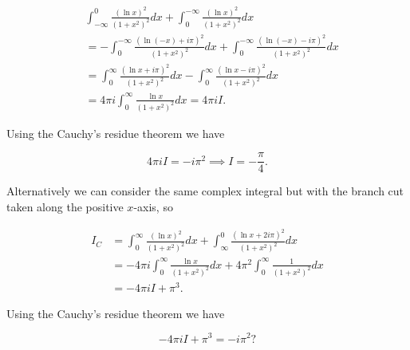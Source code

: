 \documentclass[english,a4paper,12pt]{report}
\begin{document}
{\begin{equation}
    \begin{aligned}
        &\int_{-\infty}^{0} \frac{(\ln x)^2}{(1+x^2)^2} dx + \int_{0}^{-\infty} \frac{(\ln x)^2}{(1+x^2)^2}dx \\
        &= -\int_{0}^{-\infty} \frac{(\ln (-x)+i\pi )^2}{(1+x^2)^2}dx + \int_{0}^{-\infty} \frac{(\ln (-x)-i\pi )^2}{(1+x^2)^2}dx\\
        &= \int_{0}^{\infty} \frac{(\ln x+i\pi )^2}{(1+x^2)^2}dx - \int_{0}^{\infty} \frac{(\ln x-i\pi )^2}{(1+x^2)^2}dx \\
        &= 4\pi i \int_{0}^{\infty} \frac{\ln x}{(1+x^2)^2}dx = 4\pi iI.                
    \end{aligned}
\end{equation}

Using the Cauchy's residue theorem we have 

\begin{equation}
    4\pi i I = -i\pi ^2 \implies I = -\frac{\pi }{4}. 
\end{equation}

Alternatively we can consider the same complex integral but with the branch cut taken along the positive \(x\)-axis, so 

\begin{equation}
    \begin{aligned}
        I_{C} &= \int_{0}^{\infty} \frac{(\ln x)^2}{(1+x^2)^2}dx + \int_{\infty}^{0} \frac{(\ln x + 2i\pi )^2}{(1+x^2)^2} dx\\
        &= -4\pi i \int_{0}^{\infty} \frac{\ln x}{(1+x^2)^2}dx + 4\pi ^2\int_{0}^{\infty} \frac{1}{(1+x^2)^2}dx\\
        &= -4\pi i I + \pi ^3 .             
    \end{aligned}
\end{equation}

Using the Cauchy's residue theorem we have 

\begin{equation}
    -4\pi iI + \pi ^3 = -i\pi ^2?
\end{equation}
~
}  
\end{document}
